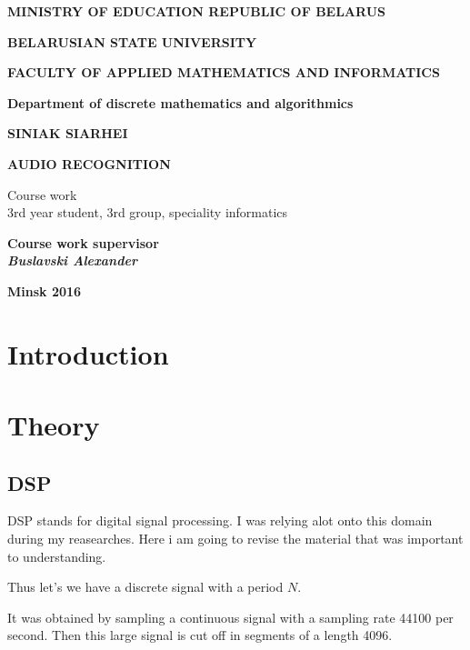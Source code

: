 \documentclass[oneside, final, 14pt]{extarticle}
\begin{document}
\begin{titlepage}

\centerline{\bf MINISTRY OF EDUCATION REPUBLIC OF BELARUS}
\bigskip
\bigskip
\centerline{\bf BELARUSIAN STATE UNIVERSITY}
\bigskip
\bigskip
\centerline{\bf FACULTY OF APPLIED MATHEMATICS AND INFORMATICS}
\bigskip
\bigskip
\centerline{\bf Department of discrete mathematics and algorithmics}
\vfill
\vfill
\vfill
\centerline{\bf SINIAK SIARHEI}
\bigskip
\bigskip
\centerline{\large \bf AUDIO RECOGNITION}
\vfill
\begin{centering}
  {
  Course work \\
  3rd year student, 3rd group, speciality
  \guillemotleft informatics\guillemotright \\}
\end{centering}
\vfill
\vfill
\hfill
\begin{minipage}{0.35\textwidth}
  {\bf Course work supervisor \\
  {\small{\it Buslavski Alexander}}}
\end{minipage}
\vfill
\vfill
\centerline{\large \bf Minsk 2016}

\restoregeometry

\end{titlepage}

\setcounter{page}{2}

\tableofcontents

\cleardoublepage

\section{Introduction}

\section{Theory}

\subsection{DSP}

DSP stands for digital signal processing. I was relying alot
onto this domain during my reasearches. Here i am going to
revise the material that was important to understanding.

Thus let's we have a discrete signal with a period $N$.

It was obtained by sampling a continuous signal
with a sampling rate 44100 per second.
Then this large signal is cut off in segments of a length 4096.
\end{document}
